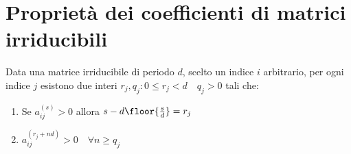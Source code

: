 \documentclass[\main/main.tex]{subfiles}
\begin{document}
\section{Proprietà dei coefficienti di matrici irriducibili}
\begin{theorem}
  Data una matrice irriducibile di periodo \(d\), scelto un indice \(i\) arbitrario, per ogni indice \(j\) esistono due interi \(r_j, q_j: 0\leq r_j < d \quad q_j > 0\) tali che:
  \begin{enumerate}
    \item Se \(a_{ij}^{(s)}>0\) allora \(s - d\floor{\frac{s}{d}}=r_j\)
    \item \(a_{ij}^{(r_j + nd)}>0 \quad \forall n \geq q_j\)
  \end{enumerate}
\end{theorem}
\end{document}
